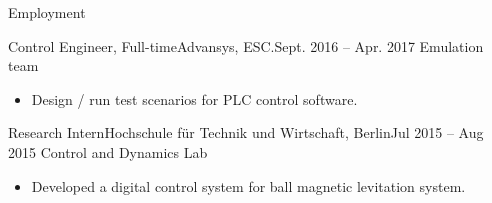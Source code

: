 \documentclass[]{mcdowellcv}
\begin{document}
\begin{cvsection}{Employment}
		\begin{cvsubsection}{Control Engineer, Full-time}{Advansys, ESC.}{Sept. 2016 -- Apr. 2017}
			Emulation team
			\begin{itemize}
				\item Design / run test scenarios for PLC control software.
			\end{itemize}
		\end{cvsubsection}
		
		\begin{cvsubsection}{Research Intern}{Hochschule für Technik und Wirtschaft, Berlin}{Jul 2015 -- Aug 2015}
			Control and Dynamics Lab		
			\begin{itemize}
				\item Developed a digital control system for ball magnetic levitation system.
			\end{itemize}
		\end{cvsubsection}
		
	\end{cvsection}
	
\end{document}
